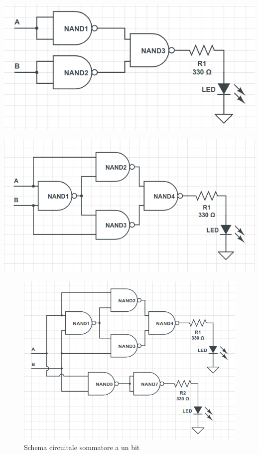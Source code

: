 \documentclass{article}
\begin{document}
	\begin{minipage}{.5\linewidth}
		\centering
		\includegraphics[width=\linewidth]{figure/OR}
		\label{fig:OR}
	\end{minipage}
	\begin{minipage}{.55\linewidth}
		\includegraphics[width=\linewidth]{figure/XOR}
		\label{fig:XOR}
	\end{minipage}\newline
	
	\begin{figure}
		\centering
		\includegraphics[width=\linewidth]{figure/Sommatore}
		\caption{Schema circuitale sommatore a un bit}
		\label{fig:sommatore}
	\end{figure}
\end{document}
